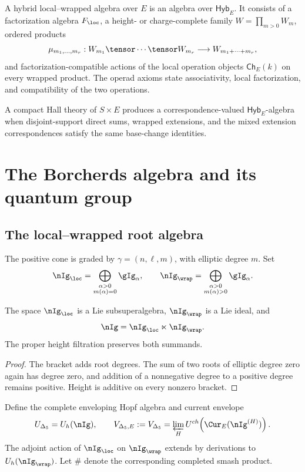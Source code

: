 \begin{definition}
A hybrid local--wrapped algebra over $E$ is an algebra over $\mathsf{Hyb}_E$. It consists of a factorization algebra $\F_{\loc}$, a height- or charge-complete family $W=\prod_{m>0}W_m$, ordered products
\[
 \mu_{m_1,\ldots,m_r}:W_{m_1}\tensor\cdots\tensor W_{m_r}
 \longrightarrow W_{m_1+\cdots+m_r},
\]
and factorization-compatible actions of the local operation objects $\mathsf{Ch}_E(k)$ on every wrapped product. The operad axioms state associativity, local factorization, and compatibility of the two operations.
\end{definition}

A compact Hall theory of $S\times E$ produces a correspondence-valued $\mathsf{Hyb}_E$-algebra when disjoint-support direct sums, wrapped extensions, and the mixed extension correspondences satisfy the same base-change identities.


\part{The Borcherds algebra and its quantum group}

\chapter{The local--wrapped root algebra}
The positive cone is graded by $\gamma=(n,\ell,m)$, with elliptic degree $m$.  Set
\[
 \nIg_{\loc}=\bigoplus_{\substack{\alpha>0\\m(\alpha)=0}}\gIg_\alpha,
 \qquad
 \nIg_{\wrap}=\bigoplus_{\substack{\alpha>0\\m(\alpha)>0}}\gIg_\alpha.
\]

\begin{proposition}
The space $\nIg_{\loc}$ is a Lie subsuperalgebra, $\nIg_{\wrap}$ is a Lie ideal, and
\[
 \nIg=\nIg_{\loc}\ltimes\nIg_{\wrap}.
\]
The proper height filtration preserves both summands.
\end{proposition}
\begin{proof}
The bracket adds root degrees.  The sum of two roots of elliptic degree zero again has degree zero, and addition of a nonnegative degree to a positive degree remains positive.  Height is additive on every nonzero bracket.
\end{proof}

Define the complete enveloping Hopf algebra and current envelope
\[
 \mathbb U_{\Delta_5}=\widehat U_h(\nIg),
 \qquad
 \mathbb V_{\Delta_5,E}:=\widehat V_{\Delta_5}=\varprojlim_HU^{\ch}\!\left(\Cur_E(\nIg^{(H)})\right).
\]
The adjoint action of $\nIg_{\loc}$ on $\nIg_{\wrap}$ extends by derivations to $\widehat U_h(\nIg_{\wrap})$.  Let $\# $ denote the corresponding completed smash product.

